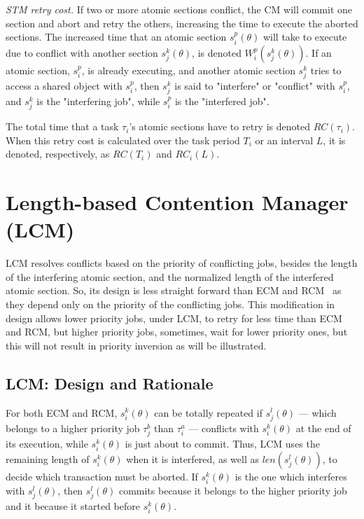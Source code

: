 \documentclass[conference]{IEEEtran}
\begin{document}
\textit{STM retry cost.} If two or more atomic sections conflict, the CM will commit one section and abort and retry the others, increasing the time to execute the aborted sections. The increased time that an atomic section $s_i^p (\theta)$ will take to execute due to conflict with another section $s_j^k (\theta)$, is denoted $W_{i}^{p}(s_{j}^{k}(\theta))$. If an atomic section, $s_i^p$, is already executing, and another atomic section $s_j^k$ tries to access a shared object with $s_i^p$, then $s_j^k$ is said to "interfere" or "conflict" with $s_i^p$, and $s_j^k$ is the "interfering job", while $s_i^p$ is the "interfered job".

The total time that a task $\tau_i$'s atomic sections have to retry is denoted $RC(\tau_i)$.
When this retry cost is calculated over the task period $T_i$ or an interval $L$, it is   denoted, respectively, as $RC(T_i)$ and $RC_i(L)$. 

\section{Length-based Contention Manager (LCM)}

LCM resolves conflicts based on the priority of conflicting jobs, besides the length of the interfering atomic section, and the normalized length of the interfered atomic section. So, its design is less straight forward than ECM and RCM~\cite{stmconcurrencycontrol:emsoft11} as they depend only on the priority of the conflicting jobs. This modification in design allows lower priority jobs, under LCM, to retry for less time than ECM and RCM, but higher priority jobs, sometimes, wait for lower priority ones, but this will not result in priority inversion as will be illustrated.

\subsection{\label{sec 9.1} LCM: Design and Rationale}

For both ECM and RCM, $s_{i}^{k}(\theta)$ can be totally repeated if $s_{j}^{l}(\theta)$ --- which belongs to a higher priority job $\tau_{j}^b$ than $\tau_{i}^a$ --- conflicts with $s_{i}^{k}(\theta)$
at the end of its execution, while $s_{i}^{k}(\theta)$ is just about
to commit. Thus, LCM  uses the remaining length of $s_{i}^{k}(\theta)$ when it is interfered,
as well as $len(s_{j}^{l}(\theta))$, to decide which transaction must be aborted. If $s_i^k (\theta)$ is the one which interferes with $s_j^l (\theta)$, then $s_j^l (\theta)$ commits because it belongs to the higher priority job and it because it started before $s_i^k (\theta)$.
\end{document}
